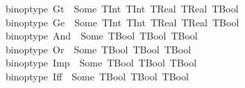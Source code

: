 \begin{isabellebody}
\ \ {\isacharbar}{\kern0pt}\ {\isachardoublequoteopen}binop{\isacharunderscore}{\kern0pt}type\ Gt\ {\isacharequal}{\kern0pt}\ Some\ {\isacharparenleft}{\kern0pt}{\isacharbraceleft}{\kern0pt}{\isacharparenleft}{\kern0pt}TInt{\isacharcomma}{\kern0pt}\ TInt{\isacharparenright}{\kern0pt}{\isacharcomma}{\kern0pt}\ {\isacharparenleft}{\kern0pt}TReal{\isacharcomma}{\kern0pt}\ TReal{\isacharparenright}{\kern0pt}{\isacharbraceright}{\kern0pt}{\isacharcomma}{\kern0pt}\ TBool{\isacharparenright}{\kern0pt}{\isachardoublequoteclose}\isanewline
\ \ {\isacharbar}{\kern0pt}\ {\isachardoublequoteopen}binop{\isacharunderscore}{\kern0pt}type\ Ge\ {\isacharequal}{\kern0pt}\ Some\ {\isacharparenleft}{\kern0pt}{\isacharbraceleft}{\kern0pt}{\isacharparenleft}{\kern0pt}TInt{\isacharcomma}{\kern0pt}\ TInt{\isacharparenright}{\kern0pt}{\isacharcomma}{\kern0pt}\ {\isacharparenleft}{\kern0pt}TReal{\isacharcomma}{\kern0pt}\ TReal{\isacharparenright}{\kern0pt}{\isacharbraceright}{\kern0pt}{\isacharcomma}{\kern0pt}\ TBool{\isacharparenright}{\kern0pt}{\isachardoublequoteclose}\isanewline
\ \ {\isacharbar}{\kern0pt}\ {\isachardoublequoteopen}binop{\isacharunderscore}{\kern0pt}type\ And\ {\isacharequal}{\kern0pt}\ Some\ {\isacharparenleft}{\kern0pt}{\isacharbraceleft}{\kern0pt}{\isacharparenleft}{\kern0pt}TBool{\isacharcomma}{\kern0pt}\ TBool{\isacharparenright}{\kern0pt}{\isacharbraceright}{\kern0pt}{\isacharcomma}{\kern0pt}\ TBool{\isacharparenright}{\kern0pt}{\isachardoublequoteclose}\isanewline
\ \ {\isacharbar}{\kern0pt}\ {\isachardoublequoteopen}binop{\isacharunderscore}{\kern0pt}type\ Or\ {\isacharequal}{\kern0pt}\ Some\ {\isacharparenleft}{\kern0pt}{\isacharbraceleft}{\kern0pt}{\isacharparenleft}{\kern0pt}TBool{\isacharcomma}{\kern0pt}\ TBool{\isacharparenright}{\kern0pt}{\isacharbraceright}{\kern0pt}{\isacharcomma}{\kern0pt}\ TBool{\isacharparenright}{\kern0pt}{\isachardoublequoteclose}\isanewline
\ \ {\isacharbar}{\kern0pt}\ {\isachardoublequoteopen}binop{\isacharunderscore}{\kern0pt}type\ Imp\ {\isacharequal}{\kern0pt}\ Some\ {\isacharparenleft}{\kern0pt}{\isacharbraceleft}{\kern0pt}{\isacharparenleft}{\kern0pt}TBool{\isacharcomma}{\kern0pt}\ TBool{\isacharparenright}{\kern0pt}{\isacharbraceright}{\kern0pt}{\isacharcomma}{\kern0pt}\ TBool{\isacharparenright}{\kern0pt}{\isachardoublequoteclose}\isanewline
\ \ {\isacharbar}{\kern0pt}\ {\isachardoublequoteopen}binop{\isacharunderscore}{\kern0pt}type\ Iff\ {\isacharequal}{\kern0pt}\ Some\ {\isacharparenleft}{\kern0pt}{\isacharbraceleft}{\kern0pt}{\isacharparenleft}{\kern0pt}TBool{\isacharcomma}{\kern0pt}\ TBool{\isacharparenright}{\kern0pt}{\isacharbraceright}{\kern0pt}{\isacharcomma}{\kern0pt}\ TBool{\isacharparenright}{\kern0pt}{\isachardoublequoteclose}\isanewline

\end{isabellebody}

